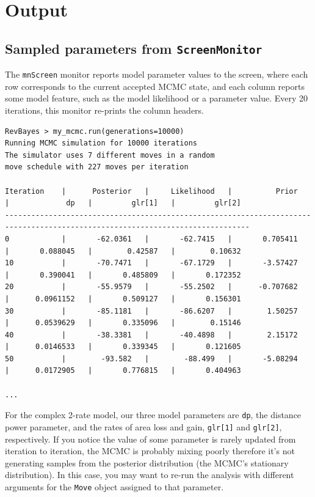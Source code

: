 \documentclass[11pt]{article}
\begin{document}
\section{Output}

\subsection{Sampled parameters from {\tt ScreenMonitor}}

The {\tt mnScreen} monitor reports model parameter values to the screen, where each row corresponds to the current accepted MCMC state, and each column reports some model feature, such as the model likelihood or a parameter value.
Every 20 iterations, this monitor re-prints the column headers.

\begin{snugshade}
\begin{lstlisting}[basicstyle=\tiny \listingsfont, columns=texcl]
RevBayes > my_mcmc.run(generations=10000)
Running MCMC simulation for 10000 iterations
The simulator uses 7 different moves in a random
move schedule with 227 moves per iteration

Iteration    |      Posterior   |     Likelihood   |          Prior   |             dp   |         glr[1]   |         glr[2]
------------------------------------------------------------------------------------------------------------------------------
0            |       -62.0361   |       -62.7415   |       0.705411   |       0.088045   |        0.42587   |        0.10632
10           |       -70.7471   |       -67.1729   |       -3.57427   |       0.390041   |       0.485809   |       0.172352
20           |       -55.9579   |       -55.2502   |      -0.707682   |      0.0961152   |       0.509127   |       0.156301
30           |       -85.1181   |       -86.6207   |        1.50257   |      0.0539629   |       0.335096   |        0.15146
40           |       -38.3381   |       -40.4898   |        2.15172   |      0.0146533   |       0.339345   |       0.121605
50           |        -93.582   |        -88.499   |       -5.08294   |      0.0172905   |       0.776815   |       0.404963

...
\end{lstlisting}
\end{snugshade}

For the complex 2-rate model, our three model parameters are {\tt dp}, the distance power parameter, and the rates of area loss and gain, {\tt glr[1]} and {\tt glr[2]}, respectively.
If you notice the value of some parameter is rarely updated from iteration to iteration, the MCMC is probably mixing poorly therefore it's not generating samples from the posterior distribution (the MCMC's stationary distribution).
In this case, you may want to re-run the analysis with different arguments for the {\tt Move} object assigned to that parameter.
\end{document}
